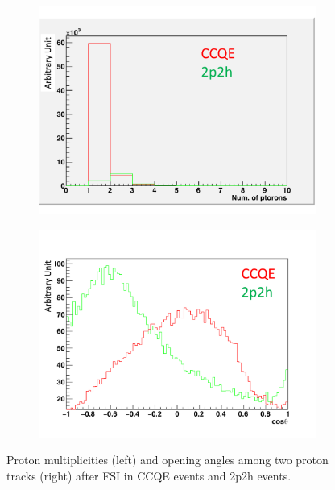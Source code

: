 \begin{figure}[tbh]
 \begin{center}
  \begin{subfigure}{0.48\textwidth}
     \includegraphics[width=\linewidth]{fig/2p2h_proton_multiplicity.pdf}
    \end{subfigure}
  \begin{subfigure}{0.48\textwidth}
    \includegraphics[width=\linewidth]{fig/2p2h_proton_angle.pdf}
    \end{subfigure}    
    \end{center}
  \caption{
Proton multiplicities (left) and opening angles among two proton tracks (right) after FSI in CCQE events and 2p2h events.
}
\label{fig:2p2h_proton_multiplicity_angle}
\end{figure}


